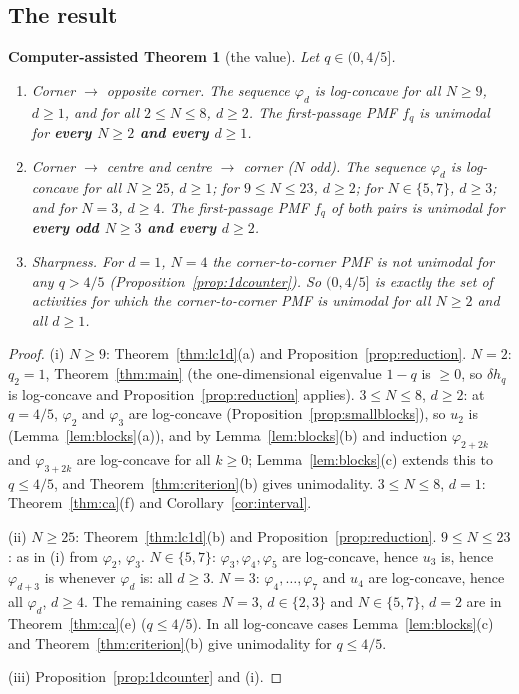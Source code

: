 \documentclass[11pt,a4paper]{article}
\newtheorem{catheorem}[theorem]{Computer-assisted Theorem}
\theoremstyle{definition}
\begin{document}
\subsection{The result}\label{sec:result}

\begin{catheorem}[the value]\label{thm:fourfifths}
Let $q\in(0,4/5]$.
\begin{enumerate}
\item[(i)] \emph{Corner $\to$ opposite corner.} The sequence $\varphi_d$ is log-concave for all $N\ge9$, $d\ge1$, and for all $2\le N\le8$, $d\ge2$. The first-passage PMF $f_q$ is unimodal for \textbf{every $N\ge2$ and every $d\ge1$}.
\item[(ii)] \emph{Corner $\to$ centre and centre $\to$ corner} ($N$ odd). The sequence $\varphi_d$ is log-concave for all $N\ge25$, $d\ge1$; for $9\le N\le23$, $d\ge2$; for $N\in\{5,7\}$, $d\ge3$; and for $N=3$, $d\ge4$. The first-passage PMF $f_q$ of both pairs is unimodal for \textbf{every odd $N\ge3$ and every $d\ge2$}.
\item[(iii)] \emph{Sharpness.} For $d=1$, $N=4$ the corner-to-corner PMF is not unimodal for any $q>4/5$ (Proposition~\ref{prop:1dcounter}). So $(0,4/5]$ is exactly the set of activities for which the corner-to-corner PMF is unimodal for all $N\ge2$ and all $d\ge1$.
\end{enumerate}
\end{catheorem}
\begin{proof}
(i) $N\ge9$: Theorem~\ref{thm:lc1d}(a) and Proposition~\ref{prop:reduction}. $N=2$: $q_2=1$, Theorem~\ref{thm:main} (the one-dimensional eigenvalue $1-q$ is $\ge0$, so $\delta h_q$ is log-concave and Proposition~\ref{prop:reduction} applies). $3\le N\le8$, $d\ge2$: at $q=4/5$, $\varphi_2$ and $\varphi_3$ are log-concave (Proposition~\ref{prop:smallblocks}), so $u_2$ is (Lemma~\ref{lem:blocks}(a)), and by Lemma~\ref{lem:blocks}(b) and induction $\varphi_{2+2k}$ and $\varphi_{3+2k}$ are log-concave for all $k\ge0$; Lemma~\ref{lem:blocks}(c) extends this to $q\le4/5$, and Theorem~\ref{thm:criterion}(b) gives unimodality. $3\le N\le8$, $d=1$: Theorem~\ref{thm:ca}(f) and Corollary~\ref{cor:interval}.

(ii) $N\ge25$: Theorem~\ref{thm:lc1d}(b) and Proposition~\ref{prop:reduction}. $9\le N\le23$: as in (i) from $\varphi_2$, $\varphi_3$. $N\in\{5,7\}$: $\varphi_3,\varphi_4,\varphi_5$ are log-concave, hence $u_3$ is, hence $\varphi_{d+3}$ is whenever $\varphi_d$ is: all $d\ge3$. $N=3$: $\varphi_4,\dots,\varphi_7$ and $u_4$ are log-concave, hence all $\varphi_d$, $d\ge4$. The remaining cases $N=3$, $d\in\{2,3\}$ and $N\in\{5,7\}$, $d=2$ are in Theorem~\ref{thm:ca}(e) ($q\le4/5$). In all log-concave cases Lemma~\ref{lem:blocks}(c) and Theorem~\ref{thm:criterion}(b) give unimodality for $q\le4/5$.

(iii) Proposition~\ref{prop:1dcounter} and (i).
\end{proof}
\end{document}
